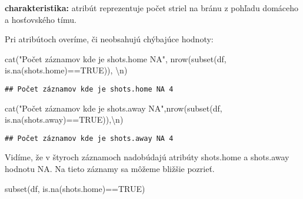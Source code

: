 \documentclass[
]{article}
\newenvironment{Shaded}{\begin{snugshade}}{\end{snugshade}}
\newcommand{\ConstantTok}[1]{\textcolor[rgb]{0.00,0.00,0.00}{#1}}
\newcommand{\FunctionTok}[1]{\textcolor[rgb]{0.00,0.00,0.00}{#1}}
\newcommand{\NormalTok}[1]{#1}
\newcommand{\SpecialCharTok}[1]{\textcolor[rgb]{0.00,0.00,0.00}{#1}}
\newcommand{\StringTok}[1]{\textcolor[rgb]{0.31,0.60,0.02}{#1}}
\begin{document}
\textbf{charakteristika:} atribút reprezentuje počet striel na bránu z
pohľadu domáceho a hosťovského tímu.

Pri atribútoch overíme, či neobsahujú chýbajúce hodnoty:

\begin{Shaded}
\begin{Highlighting}[]
\FunctionTok{cat}\NormalTok{(}\StringTok{"Počet záznamov kde je shots.home NA"}\NormalTok{, }\FunctionTok{nrow}\NormalTok{(}\FunctionTok{subset}\NormalTok{(df, }\FunctionTok{is.na}\NormalTok{(shots.home)}\SpecialCharTok{==}\ConstantTok{TRUE}\NormalTok{)), }\StringTok{\textquotesingle{}}\SpecialCharTok{\textbackslash{}n}\StringTok{\textquotesingle{}}\NormalTok{)}
\end{Highlighting}
\end{Shaded}

\begin{verbatim}
## Počet záznamov kde je shots.home NA 4
\end{verbatim}

\begin{Shaded}
\begin{Highlighting}[]
\FunctionTok{cat}\NormalTok{(}\StringTok{"Počet záznamov kde je shots.away NA"}\NormalTok{,}\FunctionTok{nrow}\NormalTok{(}\FunctionTok{subset}\NormalTok{(df, }\FunctionTok{is.na}\NormalTok{(shots.away)}\SpecialCharTok{==}\ConstantTok{TRUE}\NormalTok{)),}\StringTok{\textquotesingle{}}\SpecialCharTok{\textbackslash{}n}\StringTok{\textquotesingle{}}\NormalTok{)}
\end{Highlighting}
\end{Shaded}

\begin{verbatim}
## Počet záznamov kde je shots.away NA 4
\end{verbatim}

Vidíme, že v štyroch záznamoch nadobúdajú atribúty shots.home a
shots.away hodnotu NA. Na tieto záznamy sa môžeme bližšie pozrieť.

\begin{Shaded}
\begin{Highlighting}[]
\FunctionTok{subset}\NormalTok{(df, }\FunctionTok{is.na}\NormalTok{(shots.home)}\SpecialCharTok{==}\ConstantTok{TRUE}\NormalTok{)}
\end{Highlighting}
\end{Shaded}
\end{document}
